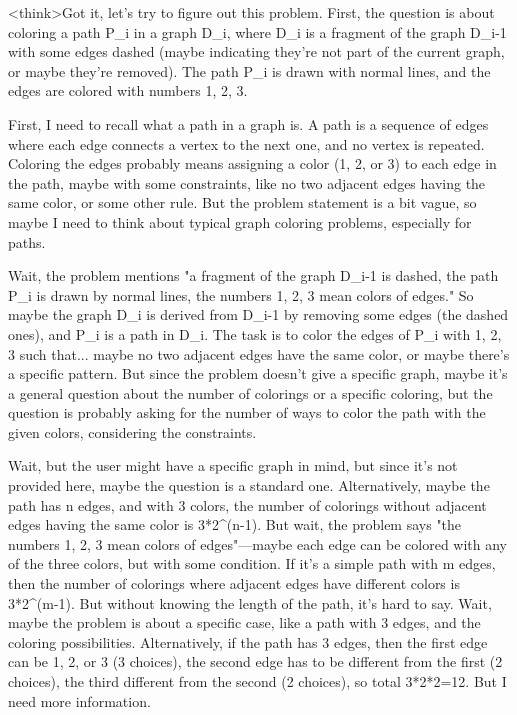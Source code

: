 <think>Got it, let's try to figure out this problem. First, the question is about coloring a path P_i in a graph D_i, where D_i is a fragment of the graph D_i-1 with some edges dashed (maybe indicating they're not part of the current graph, or maybe they're removed). The path P_i is drawn with normal lines, and the edges are colored with numbers 1, 2, 3. 

First, I need to recall what a path in a graph is. A path is a sequence of edges where each edge connects a vertex to the next one, and no vertex is repeated. Coloring the edges probably means assigning a color (1, 2, or 3) to each edge in the path, maybe with some constraints, like no two adjacent edges having the same color, or some other rule. But the problem statement is a bit vague, so maybe I need to think about typical graph coloring problems, especially for paths.

Wait, the problem mentions "a fragment of the graph D_i-1 is dashed, the path P_i is drawn by normal lines, the numbers 1, 2, 3 mean colors of edges." So maybe the graph D_i is derived from D_i-1 by removing some edges (the dashed ones), and P_i is a path in D_i. The task is to color the edges of P_i with 1, 2, 3 such that... maybe no two adjacent edges have the same color, or maybe there's a specific pattern. But since the problem doesn't give a specific graph, maybe it's a general question about the number of colorings or a specific coloring, but the question is probably asking for the number of ways to color the path with the given colors, considering the constraints.

Wait, but the user might have a specific graph in mind, but since it's not provided here, maybe the question is a standard one. Alternatively, maybe the path has n edges, and with 3 colors, the number of colorings without adjacent edges having the same color is 3*2^(n-1). But wait, the problem says "the numbers 1, 2, 3 mean colors of edges"—maybe each edge can be colored with any of the three colors, but with some condition. If it's a simple path with m edges, then the number of colorings where adjacent edges have different colors is 3*2^(m-1). But without knowing the length of the path, it's hard to say. Wait, maybe the problem is about a specific case, like a path with 3 edges, and the coloring possibilities. Alternatively, if the path has 3 edges, then the first edge can be 1, 2, or 3 (3 choices), the second edge has to be different from the first (2 choices), the third different from the second (2 choices), so total 3*2*2=12. But I need more information.

